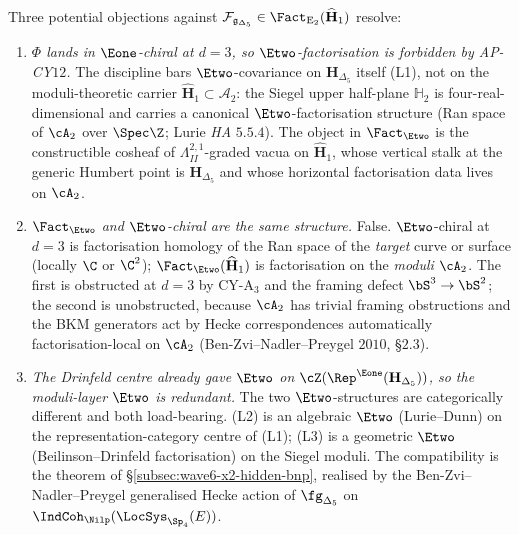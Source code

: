 \begin{proposition}
\label{prop:wave6-x2-three-attacks-resolved}
Three potential objections against
$\mathcal F_{\mathfrak g_{\Delta_5}} \in
\Fact_{\mathrm E_2}(\widehat{\mathbf H}_1)$ resolve:
\begin{enumerate}
\item[(A1)] \emph{$\Phi$ lands in $\Eone$-chiral at $d = 3$,
so $\Etwo$-factorisation is forbidden by AP-CY$12$.} The
discipline bars $\Etwo$-covariance on $\mathbf H_{\Delta_5}$
itself (L1), not on the moduli-theoretic carrier
$\widehat{\mathbf H}_1 \subset \mathcal A_2$: the Siegel upper
half-plane $\mathbb H_2$ is four-real-dimensional and carries
a canonical $\Etwo$-factorisation structure (Ran space of
$\cA_2$ over $\Spec \Z$; Lurie \emph{HA} $5.5.4$). The object
in $\Fact_{\Etwo}$ is the constructible cosheaf of
$\Lambda^{2, 1}_{II}$-graded vacua on $\widehat{\mathbf H}_1$,
whose vertical stalk at the generic Humbert point is
$\mathbf H_{\Delta_5}$ and whose horizontal factorisation data
lives on $\cA_2$.

\item[(A2)] \emph{$\Fact_{\Etwo}$ and $\Etwo$-chiral are the
same structure.} False. $\Etwo$-chiral at $d = 3$ is
factorisation homology of the Ran space of the \emph{target}
curve or surface (locally $\C$ or $\C^2$);
$\Fact_{\Etwo}(\widehat{\mathbf H}_1)$ is factorisation on the
\emph{moduli} $\cA_2$. The first is obstructed at $d = 3$ by
CY-A$_3$ and the framing defect $\bS^3 \to \bS^2$; the second
is unobstructed, because $\cA_2$ has trivial framing
obstructions and the BKM generators act by Hecke
correspondences automatically factorisation-local on $\cA_2$
(Ben-Zvi--Nadler--Preygel $2010$, \S$2.3$).

\item[(A3)] \emph{The Drinfeld centre already gave $\Etwo$ on
$\cZ(\Rep^{\Eone}(\mathbf H_{\Delta_5}))$, so the moduli-layer
$\Etwo$ is redundant.} The two $\Etwo$-structures are
categorically different and both load-bearing. (L2) is an
algebraic $\Etwo$ (Lurie--Dunn) on the representation-category
centre of (L1); (L3) is a geometric $\Etwo$
(Beilinson--Drinfeld factorisation) on the Siegel moduli. The
compatibility is the theorem of
\S\ref{subsec:wave6-x2-hidden-bnp}, realised by the
Ben-Zvi--Nadler--Preygel generalised Hecke action of
$\fg_{\Delta_5}$ on
$\IndCoh_{\Nilp}(\LocSys_{\Sp_4}(E))$.
\end{enumerate}
\end{proposition}

